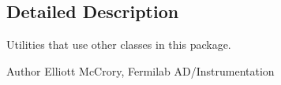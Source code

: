 \subsection{Detailed Description}
Utilities that use other classes in this package.

\begin{DoxyAuthor}{Author}
Elliott Mc\-Crory, Fermilab A\-D/\-Instrumentation 
\end{DoxyAuthor}
